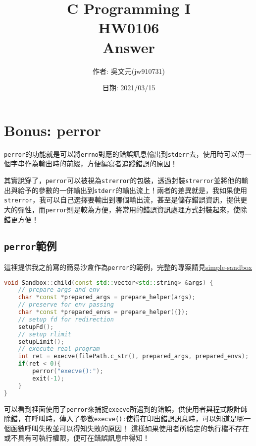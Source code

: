 \documentclass[a4paper,10pt]{article}
\title{C Programming I\\HW0106\\Answer}
\author{作者: 吳文元(jw910731)}
\date{日期: 2021/03/15}
\begin{document}
\maketitle
\section{Bonus: perror}

\lstinline{perror}的功能就是可以將\lstinline{errno}對應的錯誤訊息輸出到\lstinline{stderr}去，使用時可以傳一個字串作為輸出時的前綴，方便編寫者追蹤錯誤的原因！

其實說穿了，\lstinline{perror}可以被視為\lstinline{strerror}的包裝，透過封裝\lstinline{strerror}並將他的輸出與給予的參數的一併輸出到\lstinline{stderr}的輸出流上！兩者的差異就是，我如果使用\lstinline{strerror}，我可以自己選擇要輸出到哪個輸出流，甚至是儲存錯誤資訊，提供更大的彈性，而\lstinline{perror}則是較為方便，將常用的錯誤資訊處理方式封裝起來，使除錯更方便！

\subsection{\lstinline{perror}範例}
這裡提供我之前寫的簡易沙盒作為\lstinline{perror}的範例，完整的專案請見\href{https://github.com/jw910731/simple-sandbox}{simple-sandbox}

\begin{lstlisting}[language=c++, label={lst:perror Example}, caption={perror Example in \lstinline{src/sandbox.cpp}}, firstnumber=136]
void Sandbox::child(const std::vector<std::string> &args) {
    // prepare args and env
    char *const *prepared_args = prepare_helper(args);
    // preserve for env passing
    char *const *prepared_envs = prepare_helper({});
    // setup fd for redirection
    setupFd();
    // setup rlimit
    setupLimit();
    // execute real program
    int ret = execve(filePath.c_str(), prepared_args, prepared_envs);
    if(ret < 0){
        perror("execve():");
        exit(-1);
    }
}
\end{lstlisting}

可以看到裡面使用了\lstinline{perror}來捕捉\lstinline{execve}所遇到的錯誤，供使用者與程式設計師除錯，在呼叫時，傳入了參數\lstinline{execve():}使得在印出錯誤訊息時，可以知道是哪一個函數呼叫失敗並可以得知失敗的原因！
這樣如果使用者所給定的執行檔不存在或不具有可執行權限，便可在錯誤訊息中得知！
\end{document}
